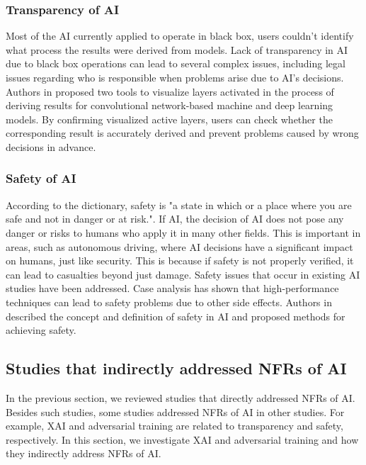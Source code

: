 \documentclass[journal,article,submit,moreauthors,pdftex]{Definitions/mdpi}
\begin{document}
\subsubsection{Transparency of AI}

Most of the AI currently applied to operate in black box, users couldn't identify what process the results were derived from models.
Lack of transparency in AI due to black box operations can lead to several complex issues, including legal issues regarding who is responsible when problems arise due to AI's decisions.
Authors in \cite{transparency-yosinski} proposed two tools to visualize layers activated in the process of deriving results for convolutional network-based machine and deep learning models.
By confirming visualized active layers, users can check whether the corresponding result is accurately derived and prevent problems caused by wrong decisions in advance.

\subsubsection{Safety of AI}

According to the dictionary, safety is "a state in which or a place where you are safe and not in danger or at risk.".
If AI, the decision of AI does not pose any danger or risks to humans who apply it in many other fields.
This is important in areas, such as autonomous driving, where AI decisions have a significant impact on humans, just like security.
This is because if safety is not properly verified, it can lead to casualties beyond just damage.
Safety issues that occur in existing AI studies have been addressed\cite{safety-amodei}.
Case analysis has shown that high-performance techniques can lead to safety problems due to other side effects.
Authors in \cite{safety-juric,safety-leike} described the concept and definition of safety in AI and proposed methods for achieving safety.

\subsection{Studies that indirectly addressed NFRs of AI}

In the previous section, we reviewed studies that directly addressed NFRs of AI.
Besides such studies, some studies addressed NFRs of AI in other studies.
For example, XAI and adversarial training are related to transparency and safety, respectively.
In this section, we investigate XAI and adversarial training and how they indirectly address NFRs of AI.
\end{document}
